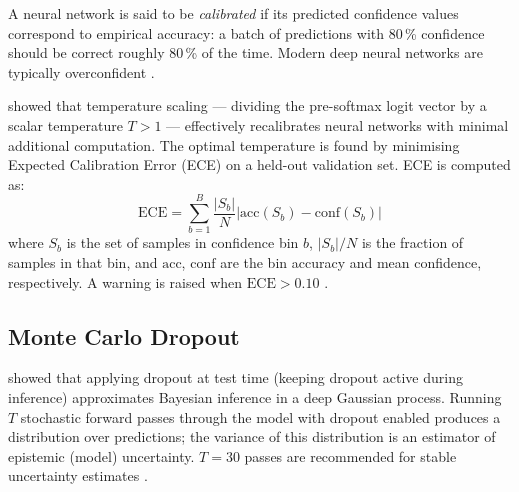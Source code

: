 A neural network is said to be \textit{calibrated} if its predicted confidence
values correspond to empirical accuracy: a batch of predictions with 80\,\%
confidence should be correct roughly 80\,\% of the time.
Modern deep neural networks are typically overconfident \citep{guo2017calibration}.

\citet{guo2017calibration} showed that temperature scaling --- dividing the
pre-softmax logit vector by a scalar temperature $T > 1$ --- effectively
recalibrates neural networks with minimal additional computation.
The optimal temperature is found by minimising Expected Calibration Error (ECE)
on a held-out validation set.
ECE is computed as:
\begin{equation}
  \text{ECE} = \sum_{b=1}^{B} \frac{|S_b|}{N}
    \left| \mathrm{acc}(S_b) - \mathrm{conf}(S_b) \right|
  \label{eq:ece}
\end{equation}
where $S_b$ is the set of samples in confidence bin $b$, $|S_b|/N$ is the
fraction of samples in that bin, and $\mathrm{acc}$, $\mathrm{conf}$ are the
bin accuracy and mean confidence, respectively.
A warning is raised when $\text{ECE} > 0.10$ \citep{naeini2015obtaining}.

\subsection{Monte Carlo Dropout}

\citet{gal2016dropout} showed that applying dropout at test time (keeping
dropout active during inference) approximates Bayesian inference in a deep
Gaussian process.
Running $T$ stochastic forward passes through the model with dropout enabled
produces a distribution over predictions; the variance of this distribution
is an estimator of epistemic (model) uncertainty.
$T = 30$ passes are recommended for stable uncertainty estimates
\citep{gal2016dropout}.
